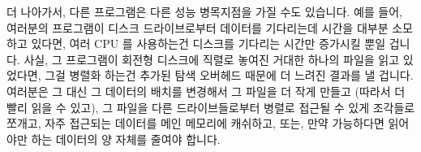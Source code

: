 \fi

더 나아가서, 다른 프로그램은 다른 성능 병목지점을 가질 수도 있습니다.
예를 들어, 여러분의 프로그램이 디스크 드라이브로부터 데이터를 기다리는데 시간을
대부분 소모하고 있다면, 여러 CPU 를 사용하는건 디스크를 기다리는 시간만
증가시킬 뿐일 겁니다.
사실, 그 프로그램이 회전형 디스크에 직렬로 놓여진 거대한 하나의 파일을 읽고
있었다면, 그걸 병렬화 하는건 추가된 탐색 오버헤드 때문에 더 느려진 결과를 낼
겁니다.
여러분은 그 대신 그 데이터의 배치를 변경해서 그 파일을 더 작게 만들고 (따라서
더 빨리 읽을 수 있고), 그 파일을 다른 드라이브들로부터 병렬로 접근될 수 있게
조각들로 쪼개고, 자주 접근되는 데이터를 메인 메모리에 캐쉬하고, 또는, 만약
가능하다면 읽어야만 하는 데이터의 양 자체를 줄여야 합니다.

